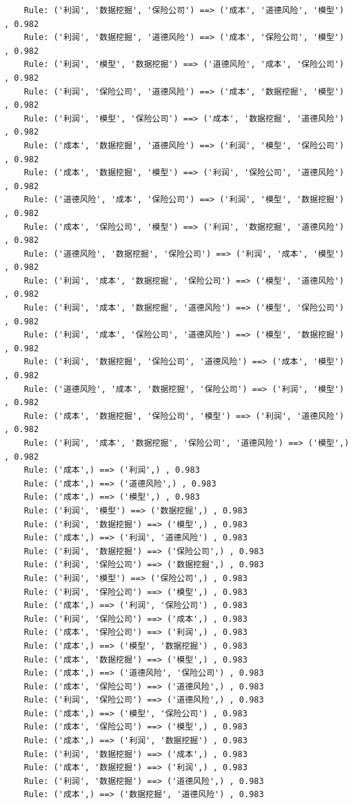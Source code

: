 \documentclass[lang=cn,11pt,a4paper,cite=authoryear]{elegantpaper}
\begin{document}
\begin{lstlisting}
	Rule: ('利润', '数据挖掘', '保险公司') ==> ('成本', '道德风险', '模型') , 0.982
	Rule: ('利润', '数据挖掘', '道德风险') ==> ('成本', '保险公司', '模型') , 0.982
	Rule: ('利润', '模型', '数据挖掘') ==> ('道德风险', '成本', '保险公司') , 0.982
	Rule: ('利润', '保险公司', '道德风险') ==> ('成本', '数据挖掘', '模型') , 0.982
	Rule: ('利润', '模型', '保险公司') ==> ('成本', '数据挖掘', '道德风险') , 0.982
	Rule: ('成本', '数据挖掘', '道德风险') ==> ('利润', '模型', '保险公司') , 0.982
	Rule: ('成本', '数据挖掘', '模型') ==> ('利润', '保险公司', '道德风险') , 0.982
	Rule: ('道德风险', '成本', '保险公司') ==> ('利润', '模型', '数据挖掘') , 0.982
	Rule: ('成本', '保险公司', '模型') ==> ('利润', '数据挖掘', '道德风险') , 0.982
	Rule: ('道德风险', '数据挖掘', '保险公司') ==> ('利润', '成本', '模型') , 0.982
	Rule: ('利润', '成本', '数据挖掘', '保险公司') ==> ('模型', '道德风险') , 0.982
	Rule: ('利润', '成本', '数据挖掘', '道德风险') ==> ('模型', '保险公司') , 0.982
	Rule: ('利润', '成本', '保险公司', '道德风险') ==> ('模型', '数据挖掘') , 0.982
	Rule: ('利润', '数据挖掘', '保险公司', '道德风险') ==> ('成本', '模型') , 0.982
	Rule: ('道德风险', '成本', '数据挖掘', '保险公司') ==> ('利润', '模型') , 0.982
	Rule: ('成本', '数据挖掘', '保险公司', '模型') ==> ('利润', '道德风险') , 0.982
	Rule: ('利润', '成本', '数据挖掘', '保险公司', '道德风险') ==> ('模型',) , 0.982
	Rule: ('成本',) ==> ('利润',) , 0.983
	Rule: ('成本',) ==> ('道德风险',) , 0.983
	Rule: ('成本',) ==> ('模型',) , 0.983
	Rule: ('利润', '模型') ==> ('数据挖掘',) , 0.983
	Rule: ('利润', '数据挖掘') ==> ('模型',) , 0.983
	Rule: ('成本',) ==> ('利润', '道德风险') , 0.983
	Rule: ('利润', '数据挖掘') ==> ('保险公司',) , 0.983
	Rule: ('利润', '保险公司') ==> ('数据挖掘',) , 0.983
	Rule: ('利润', '模型') ==> ('保险公司',) , 0.983
	Rule: ('利润', '保险公司') ==> ('模型',) , 0.983
	Rule: ('成本',) ==> ('利润', '保险公司') , 0.983
	Rule: ('利润', '保险公司') ==> ('成本',) , 0.983
	Rule: ('成本', '保险公司') ==> ('利润',) , 0.983
	Rule: ('成本',) ==> ('模型', '数据挖掘') , 0.983
	Rule: ('成本', '数据挖掘') ==> ('模型',) , 0.983
	Rule: ('成本',) ==> ('道德风险', '保险公司') , 0.983
	Rule: ('成本', '保险公司') ==> ('道德风险',) , 0.983
	Rule: ('利润', '保险公司') ==> ('道德风险',) , 0.983
	Rule: ('成本',) ==> ('模型', '保险公司') , 0.983
	Rule: ('成本', '保险公司') ==> ('模型',) , 0.983
	Rule: ('成本',) ==> ('利润', '数据挖掘') , 0.983
	Rule: ('利润', '数据挖掘') ==> ('成本',) , 0.983
	Rule: ('成本', '数据挖掘') ==> ('利润',) , 0.983
	Rule: ('利润', '数据挖掘') ==> ('道德风险',) , 0.983
	Rule: ('成本',) ==> ('数据挖掘', '道德风险') , 0.983

\end{lstlisting}
\end{document}
